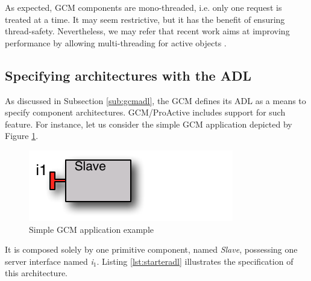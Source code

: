 	
		As expected, \ac{GCM} components are mono-threaded, i.e. only one request is treated at a time.
	It may seem restrictive, but it has the benefit of ensuring thread-safety. Nevertheless,
	we may refer that recent work aims at improving performance by allowing multi-threading
	for active objects \cite{henrio:hal-00818482}.
	
	
\subsection{Specifying architectures with the ADL}
\label{sub:gcmproadl}

	
		As discussed in Subsection \ref{sub:gcmadl}, the \ac{GCM} defines its \ac{ADL} as a means
	to specify component architectures. GCM/ProActive includes support for such feature. For instance,
	let us consider the simple \ac{GCM} application depicted by Figure \ref{fig:starter}.

		\begin{figure}[H]
		\centering
	   \includegraphics[scale=1]{figures/chapter2/starter.pdf} 	
   		\caption{Simple GCM application example}
   		\label{fig:starter}
		\end{figure}


	\noindent It is composed solely by one primitive component, named \textit{Slave}, possessing one server interface
	named \textit{i$_1$}. Listing \ref{lst:starteradl} illustrates the specification of this architecture. 

		

